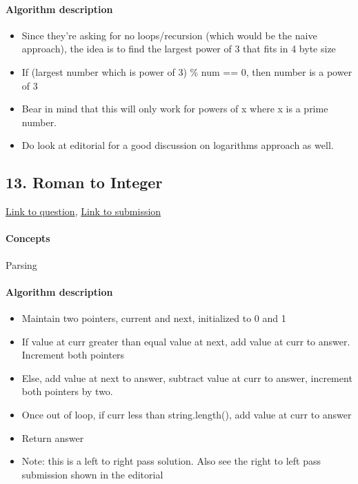 \documentclass[11pt]{book}
\begin{document}
\paragraph{Algorithm description}
\begin{itemize}
    \item Since they're asking for no loops/recursion (which would be the naive approach), the idea is to find the largest power of 3 that fits in 4 byte size
    \item If (largest number which is power of 3) \% num == 0, then number is a power of 3
    \item Bear in mind that this will only work for powers of x where x is a prime number.
    \item Do look at editorial for a good discussion on logarithms approach as well.
\end{itemize}

\subsection{13. Roman to Integer}
\href{https://leetcode.com/problems/roman-to-integer/}{Link to question},
\href{https://leetcode.com/submissions/detail/335726047/}{Link to submission}
\paragraph{Concepts}
Parsing
\paragraph{Algorithm description}
\begin{itemize}
    \item Maintain two pointers, current and next, initialized to 0 and 1
    \item If value at curr greater than equal value at next, add value at curr to answer. Increment both pointers
    \item Else, add value at next to answer, subtract value at curr to answer, increment both pointers by two.
    \item Once out of loop, if curr less than string.length(), add value at curr to answer
    \item Return answer
    \item Note: this is a left to right pass solution. Also see the right to left pass submission shown in the editorial
\end{itemize}

\newpage
\end{document}
